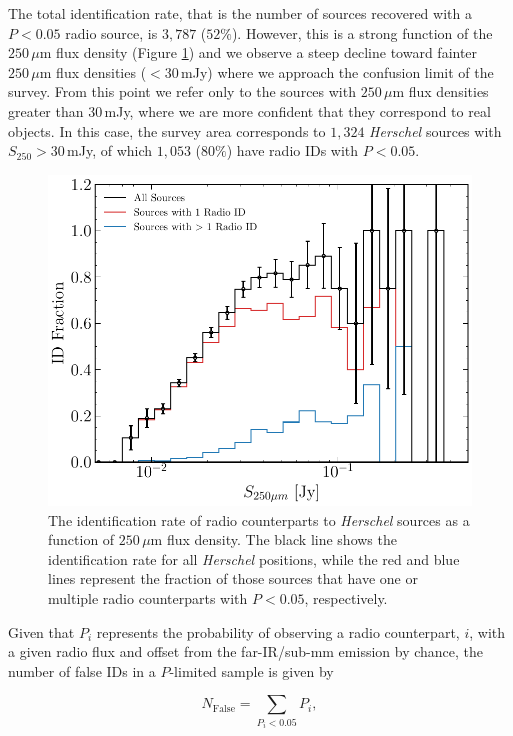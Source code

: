 The total identification rate, that is the number of sources recovered with a $P < 0.05$ radio source, is $3,787$ ($52\%$). However, this is a strong function of the $250\,\mu$m flux density (Figure \ref{fig:id_rate}) and we observe a steep decline toward fainter $250\,\mu$m flux densities ($< 30\,$mJy) where we approach the confusion limit of the survey. From this point we refer only to the sources with $250\,\mu$m flux densities greater than 30\,mJy, where we are more confident that they correspond to real objects. In this case, the survey area corresponds to $1,324$ \textit{Herschel} sources with $S_{250} > 30\,$mJy, of which $1,053$ ($80\%$) have radio IDs with $P < 0.05$.

\begin{figure}
	\centering
	\includegraphics[width=0.8\columnwidth]{Figures/id_fraction_radio.pdf}
	\caption[Identification rate of radio counterparts to \textit{Herschel} sources]{The identification rate of radio counterparts to \textit{Herschel} sources as a function of $250\,\mu$m flux density. The black line shows the identification rate for all \textit{Herschel} positions, while the red and blue lines represent the fraction of those sources that have one or multiple radio counterparts with $P < 0.05$, respectively.}
	\label{fig:id_rate}
\end{figure}

Given that $P_i$ represents the probability of observing a radio counterpart, $i$, with a given radio flux and offset from the far-IR/sub-mm emission by chance, the number of false IDs in a $P$-limited sample is given by

\begin{equation}
    N_{\textrm{False}} = \sum_{P_i < 0.05} P_i,
    \label{eq:false_radio_ids}
\end{equation}

